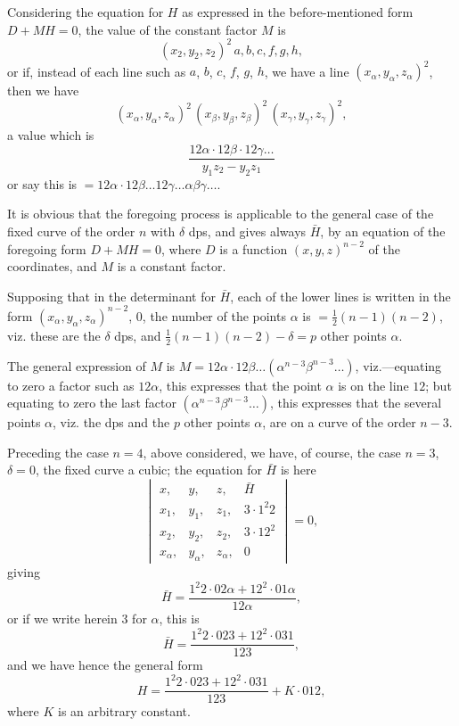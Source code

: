 \documentclass[11pt,a4paper]{book}
\begin{document}
\begin{art}\label{art:46}
Considering the equation for $H$ as expressed in the before-mentioned form $D + MH = 0$, the value of the constant factor $M$ is
\[
(x_2, y_2, z_2)^2\, a, b, c, f, g, h,
\]
or if, instead of each line such as $a$, $b$, $c$, $f$, $g$, $h$, we have a line $(x_\alpha, y_\alpha, z_\alpha)^2$, then we have
\[
(x_\alpha, y_\alpha, z_\alpha)^2\, (x_\beta, y_\beta, z_\beta)^2\, (x_\gamma, y_\gamma, z_\gamma)^2,
\]
a value which is
\[
\frac{12\alpha \cdot 12\beta \cdot 12\gamma \ldots}{y_1 z_2 - y_2 z_1}
\]
or say this is $= 12\alpha \cdot 12\beta \ldots 12\gamma \ldots \alpha\beta\gamma\ldots$.
\end{art}

\begin{art}\label{art:47}
It is obvious that the foregoing process is applicable to the general case of the fixed curve of the order $n$ with $\delta$ dps, and gives always $\bar{H}$, by an equation of the foregoing form $D + MH = 0$, where $D$ is a function $(x, y, z)^{n-2}$ of the coordinates, and $M$ is a constant factor.

Supposing that in the determinant for $\bar{H}$, each of the lower lines is written in the form $(x_\alpha, y_\alpha, z_\alpha)^{n-2}$, $0$, the number of the points $\alpha$ is $= \frac{1}{2}(n-1)(n-2)$, viz. these are the $\delta$ dps, and $\frac{1}{2}(n-1)(n-2) - \delta = p$ other points $\alpha$.

The general expression of $M$ is $M = 12\alpha \cdot 12\beta \ldots (\alpha^{n-3}\beta^{n-3}\ldots)$, viz.---equating to zero a factor such as $12\alpha$, this expresses that the point $\alpha$ is on the line $12$; but equating to zero the last factor $(\alpha^{n-3}\beta^{n-3}\ldots)$, this expresses that the several points $\alpha$, viz. the dps and the $p$ other points $\alpha$, are on a curve of the order $n-3$.
\end{art}

\newpage
\begin{art}\label{art:48}
Preceding the case $n = 4$, above considered, we have, of course, the case $n = 3$, $\delta = 0$, the fixed curve a cubic; the equation for $\bar{H}$ is here
\[
\begin{vmatrix}
x, & y, & z, & \bar{H} \\
x_1, & y_1, & z_1, & 3 \cdot 1^2 2 \\
x_2, & y_2, & z_2, & 3 \cdot 12^2 \\
x_\alpha, & y_\alpha, & z_\alpha, & 0
\end{vmatrix} = 0,
\]
giving
\[
\bar{H} = \frac{1^2 2 \cdot 02\alpha + 12^2 \cdot 01\alpha}{12\alpha},
\]
or if we write herein $3$ for $\alpha$, this is
\[
\bar{H} = \frac{1^2 2 \cdot 023 + 12^2 \cdot 031}{123},
\]
and we have hence the general form
\[
H = \frac{1^2 2 \cdot 023 + 12^2 \cdot 031}{123} + K \cdot 012,
\]
where $K$ is an arbitrary constant.
\end{art}
\end{document}
